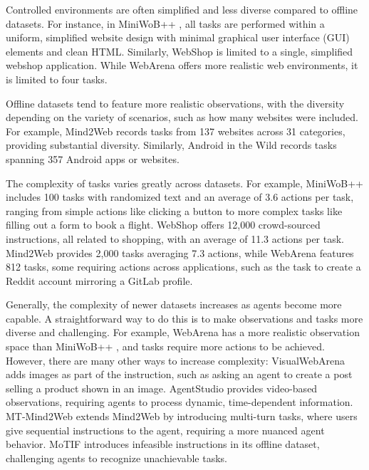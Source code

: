 Controlled environments are often simplified and less diverse compared to offline datasets. 
For instance, in MiniWoB++ \citep{shi_world_2017}, all tasks are performed within a uniform, simplified website design with minimal graphical user interface (GUI) elements and clean HTML. 
Similarly, WebShop \citep{yao_webshop_2022} is limited to a single, simplified webshop application. 
While WebArena \citep{zhou_webarena_2024} offers more realistic web environments, it is limited to four tasks.

Offline datasets tend to feature more realistic observations, with the diversity depending on the variety of scenarios, such as how many websites were included.
For example, Mind2Web \citep{deng_mind2web_2023} records tasks from 137 websites across 31 categories, providing substantial diversity.
Similarly, Android in the Wild \citep{zhang_android_2024} records tasks spanning 357 Android apps or websites.

The complexity of tasks varies greatly across datasets. 
For example, MiniWoB++ \citep{shi_world_2017} includes 100 tasks with randomized text and an average of 3.6 actions per task, ranging from simple actions like clicking a button to more complex tasks like filling out a form to book a flight. 
WebShop \citep{yao_webshop_2022} offers 12,000 crowd-sourced instructions, all related to shopping, with an average of 11.3 actions per task. 
Mind2Web \citep{deng_mind2web_2023} provides 2,000 tasks averaging 7.3 actions, while WebArena \citep{zhou_webarena_2024} features 812 tasks, some requiring actions across applications, such as the task to create a Reddit account mirroring a GitLab profile.

Generally, the complexity of newer datasets increases as agents become more capable.
A straightforward way to do this is to make observations and tasks more diverse and challenging.
For example, WebArena \citep{zhou_webarena_2024} has a more realistic observation space than MiniWoB++ \citep{shi_world_2017}, and tasks require more actions to be achieved.
However, there are many other ways to increase complexity:
VisualWebArena \citep{koh_visualwebarena_2024} adds images as part of the instruction, such as asking an agent to create a post selling a product shown in an image.
AgentStudio \citep{zheng_agentstudio_2024} provides video-based observations, requiring agents to process dynamic, time-dependent information. 
MT-Mind2Web \citep{deng_multi-turn_2024} extends Mind2Web by introducing multi-turn tasks, where users give sequential instructions to the agent, requiring a more nuanced agent behavior.
MoTIF \citep{avidan_dataset_2022} introduces infeasible instructions in its offline dataset, challenging agents to recognize unachievable tasks.

